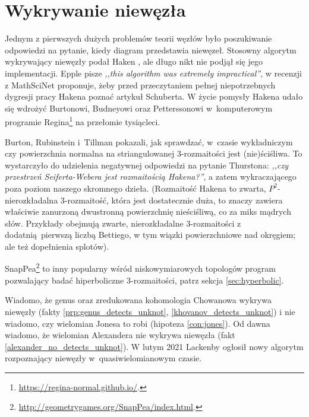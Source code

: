 
\section{Wykrywanie niewęzła}
Jednym z pierwszych dużych problemów teorii węzłów było poszukiwanie odpowiedzi na pytanie, kiedy diagram przedstawia niewęzeł.
%
Stosowny algorytm wykrywający niewęzły podał Haken \cite{haken1961}, ale długo nikt nie podjął się jego implementacji.
%
Epple pisze \emph{,,this algorithm was extremely impractical''}, w recenzji z MathSciNet proponuje, żeby przed przeczytaniem pełnej niepotrzebnych dygresji pracy Hakena poznać artykuł \cite{schubert1961} Schuberta.
%
%
W życie pomysły Hakena udało się wdrożyć Burtonowi, Budneyowi oraz Petterssonowi w~komputerowym programie Regina\footnote{\url{https://regina-normal.github.io/}.} na przełomie tysiącleci.

%
%
%

Burton, Rubinstein i~Tillman \cite{burton2012} pokazali, jak sprawdzać, w~czasie wykładniczym czy powierzchnia normalna na striangulowanej 3-rozmaitości jest (nie)ściśliwa.
%
%
To wystarczyło do udzielenia negatywnej odpowiedzi na pytanie Thurstona: \emph{,,czy przestrzeń Seiferta-Webera jest rozmaitością Hakena?''}, a zatem wykraczającego poza poziom naszego skromnego dzieła.
%
%
%
(Rozmaitość Hakena to zwarta, $P^2$-nierozkładalna 3-rozmaitość, która jest dostatecznie duża, to znaczy zawiera właściwie zanurzoną dwustronną powierzchnię nieściśliwą, co za miks mądrych słów. Przykłady obejmują zwarte, nierozkładalne 3-rozmaitości z dodatnią pierwszą liczbą Bettiego, w tym wiązki powierzchniowe nad okręgiem; ale też dopełnienia splotów).

SnapPea\footnote{\url{http://geometrygames.org/SnapPea/index.html}.} to inny popularny wśród niskowymiarowych topologów program pozwalający badać hiperboliczne 3-rozmaitości, patrz sekcja \ref{sec:hyperbolic}.

Wiadomo, że genus oraz zredukowana kohomologia Chowanowa wykrywa niewęzły (fakty \ref{prp:genus_detects_unknot}, \ref{khovanov_detects_unknot}) i nie wiadomo, czy wielomian Jonesa to robi (hipoteza \ref{con:jones}).
%
%
%
Od dawna wiadomo, że wielomian Alexandera nie wykrywa niewęzła (fakt \ref{alexander_no_detects_unknot}).
%
W lutym 2021 Lackenby ogłosił nowy algorytm rozpoznający niewęzły w~quasiwielomianowym czasie.
%


